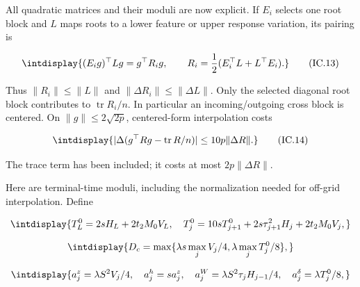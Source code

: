 
All quadratic matrices and their moduli are now explicit. If \(E_i\) selects one root block and \(L\) maps roots to a lower feature or upper response variation, its pairing is


\begingroup\renewcommand{\theHequation}{intdisplay.308}
\begin{equation}
\intdisplay{
(E_ig)^\top Lg=g^\top R_i g,\qquad
 R_i=\frac{1}{2}(E_i^\top L+L^\top E_i).
}
\tag{IC.13}
\label{int:eq-0131-ic-13}
\end{equation}
\endgroup


Thus \(\|R_i\|\le\|L\|\) and \(\|\Delta R_i\|\le\|\Delta L\|\). Only the selected diagonal root block contributes to \(\operatorname{tr}R_i/n\). In particular an incoming/outgoing cross block is centered. On \(\|g\|\le2\sqrt{2p}\), centered-form interpolation costs


\begingroup\renewcommand{\theHequation}{intdisplay.309}
\begin{equation}
\intdisplay{
|\Delta(g^\top Rg-\operatorname{tr}R/n)|
 \le10p\|\Delta R\|.
}
\tag{IC.14}
\label{int:eq-0132-ic-14}
\end{equation}
\endgroup


The trace term has been included; it costs at most \(2p\|\Delta R\|\).



Here are terminal-time moduli, including the normalization needed for off-grid interpolation. Define


\begingroup\renewcommand{\theHequation}{intdisplay.310}
\begin{equation*}
\intdisplay{
T_L^0=2sH_L+2t_2M_0V_L,\quad
 T_j^0=10sT_{j+1}^0+2s\tau_{j+1}^2H_j+2t_2M_0V_j,
}
\end{equation*}
\endgroup

\begingroup\renewcommand{\theHequation}{intdisplay.311}
\begin{equation*}
\intdisplay{
D_c=\max\{\lambda s\max_jV_j/4,\lambda\max_jT_j^0/8\},
}
\end{equation*}
\endgroup

\begingroup\renewcommand{\theHequation}{intdisplay.312}
\begin{equation*}
\intdisplay{
a_j^z=\lambda S^2V_j/4,\quad a_j^h=sa_j^z,\quad
 a_j^W=\lambda S^2\tau_jH_{j-1}/4,
 \quad a_j^\delta=\lambda T_j^0/8,
}
\end{equation*}
\endgroup


